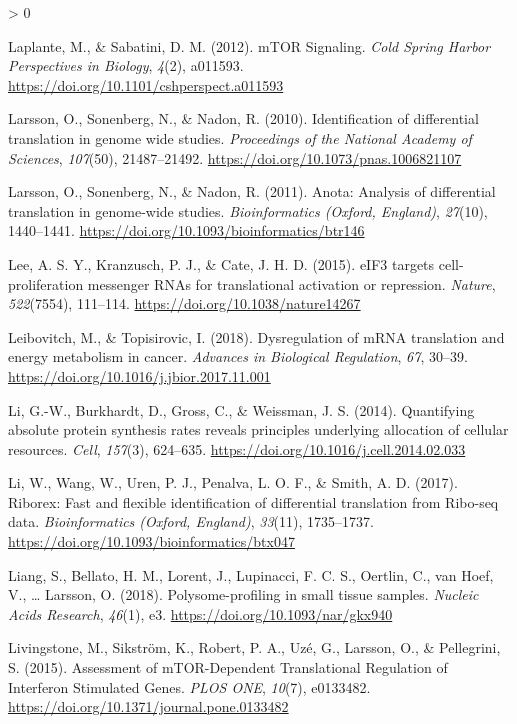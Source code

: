 \documentclass[
  12pt,
  openany]{book}
\newlength{\cslhangindent}
\newenvironment{CSLReferences}[2] %
 {%
  \setlength{\parindent}{0pt}
  \ifodd #1 \everypar{\setlength{\hangindent}{\cslhangindent}}\ignorespaces\fi
  \ifnum #2 > 0
  \setlength{\parskip}{#2\baselineskip}
  \fi
 }%
 {}
\begin{document}
\begin{CSLReferences}{1}{0}
\leavevmode\hypertarget{ref-Laplante2012}{}%
Laplante, M., \& Sabatini, D. M. (2012). {mTOR Signaling}. \emph{Cold Spring Harbor Perspectives in Biology}, \emph{4}(2), a011593. \url{https://doi.org/10.1101/cshperspect.a011593}

\leavevmode\hypertarget{ref-Larsson2010}{}%
Larsson, O., Sonenberg, N., \& Nadon, R. (2010). Identification of differential translation in genome wide studies. \emph{Proceedings of the National Academy of Sciences}, \emph{107}(50), 21487--21492. \url{https://doi.org/10.1073/pnas.1006821107}

\leavevmode\hypertarget{ref-Larsson2011}{}%
Larsson, O., Sonenberg, N., \& Nadon, R. (2011). Anota: {Analysis} of differential translation in genome-wide studies. \emph{Bioinformatics (Oxford, England)}, \emph{27}(10), 1440--1441. \url{https://doi.org/10.1093/bioinformatics/btr146}

\leavevmode\hypertarget{ref-Lee2015}{}%
Lee, A. S. Y., Kranzusch, P. J., \& Cate, J. H. D. (2015). {eIF3} targets cell-proliferation messenger {RNAs} for translational activation or repression. \emph{Nature}, \emph{522}(7554), 111--114. \url{https://doi.org/10.1038/nature14267}

\leavevmode\hypertarget{ref-Leibovitch2018}{}%
Leibovitch, M., \& Topisirovic, I. (2018). Dysregulation of {mRNA} translation and energy metabolism in cancer. \emph{Advances in Biological Regulation}, \emph{67}, 30--39. \url{https://doi.org/10.1016/j.jbior.2017.11.001}

\leavevmode\hypertarget{ref-Li2014}{}%
Li, G.-W., Burkhardt, D., Gross, C., \& Weissman, J. S. (2014). Quantifying absolute protein synthesis rates reveals principles underlying allocation of cellular resources. \emph{Cell}, \emph{157}(3), 624--635. \url{https://doi.org/10.1016/j.cell.2014.02.033}

\leavevmode\hypertarget{ref-Li2017}{}%
Li, W., Wang, W., Uren, P. J., Penalva, L. O. F., \& Smith, A. D. (2017). Riborex: Fast and flexible identification of differential translation from {Ribo}-seq data. \emph{Bioinformatics (Oxford, England)}, \emph{33}(11), 1735--1737. \url{https://doi.org/10.1093/bioinformatics/btx047}

\leavevmode\hypertarget{ref-Liang2018}{}%
Liang, S., Bellato, H. M., Lorent, J., Lupinacci, F. C. S., Oertlin, C., van Hoef, V., \ldots{} Larsson, O. (2018). Polysome-profiling in small tissue samples. \emph{Nucleic Acids Research}, \emph{46}(1), e3. \url{https://doi.org/10.1093/nar/gkx940}

\leavevmode\hypertarget{ref-Livingstone2015}{}%
Livingstone, M., Sikström, K., Robert, P. A., Uzé, G., Larsson, O., \& Pellegrini, S. (2015). Assessment of {mTOR}-{Dependent Translational Regulation} of {Interferon Stimulated Genes}. \emph{PLOS ONE}, \emph{10}(7), e0133482. \url{https://doi.org/10.1371/journal.pone.0133482}


\end{CSLReferences}
\end{document}
